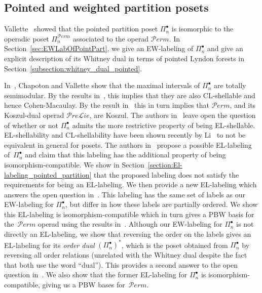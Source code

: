 \documentclass[11pt]{article}
\theoremstyle{definition}
\numberwithin{equation}{section}
\newcommand{\Perm}{\mathcal{P}erm}
\begin{document}
\subsection{Pointed and weighted partition posets} 



  Vallette~\cite{Vallette2007} showed that the pointed partition poset $\Pi_{n}^{\bullet}$ is isomorphic to the operadic poset $\Pi_n^{\Perm}$  associated to the operad $\mathcal{P}erm$. In Section~\ref{sec:EWLabOfPointPart}, we give an EW-labeling of $\Pi_n^\bullet$ and give an explicit description of its Whitney dual in terms of pointed Lyndon forests in Section~\ref{subsection:whitney_dual_pointed}. 
   
  
  
  In~\cite{ChapotonVallete2006}, Chapoton and Vallette show that the maximal intervals of  $\Pi_{n}^{\bullet}$ are totally semimodular. By the results in~\cite{BjornerWachs1983}, this implies that they are also CL-shellable and hence Cohen-Macaulay. By the result in~\cite{Vallette2007} this in turn implies that  $\mathcal{P}erm$, and its Koszul-dual operad $\mathcal{P}re\mathcal{L}ie$, are Koszul.  The authors in~\cite{ChapotonVallete2006} leave  open the question of whether or not $\Pi_{n}^{\bullet}$ admits the more restrictive property of being EL-shellable. EL-shellability and CL-shellability have been shown recently by Li~\cite{Tiansi2020} to not be equivalent in general for posets. The authors in~\cite{BelliermillesDelcroixogerHoffbeck2021} propose a possible EL-labeling of~$\Pi_{n}^{\bullet}$ and claim that this labeling has the additional property of being isomorphism-compatible. We show in Section~\ref{section:El-labeling_pointed_partition} that the proposed labeling does not satisfy the requirements for being an EL-labeling. We then provide a new EL-labeling which answers the open question in~\cite{ChapotonVallete2006}. This labeling has the same set of labels as our EW-labeling for $\Pi_{n}^{\bullet}$, but differ in how these labels are partially ordered. We show this EL-labeling is isomorphism-compatible which in turn gives a PBW basis for the~$\Perm$ operad using the results in~\cite{BelliermillesDelcroixogerHoffbeck2021}. Although our EW-labeling for $\Pi_{n}^{\bullet}$ is not directly an EL-labeling, we show that reversing the order on the labels gives an EL-labeling for its \emph{order dual} $(\Pi_{n}^{\bullet})^{*}$, which is the poset obtained from $\Pi_{n}^{\bullet}$ by reversing all order relations (unrelated with the Whitney dual despite the fact that both use the word ``dual'').    This provides a second answer to the open question in~\cite{ChapotonVallete2006}.  We also show that the former EL-labeling for $\Pi_{n}^{\bullet}$  is isomorphism-compatible, giving us a PBW bases for~$\Perm$.
\end{document}
